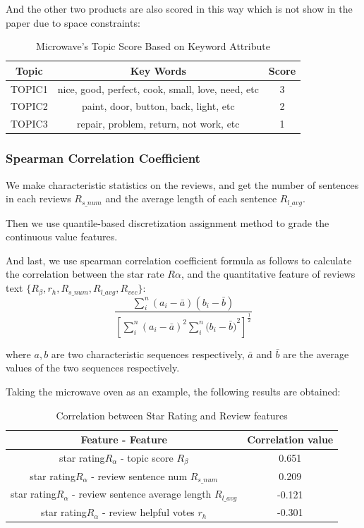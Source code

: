 \documentclass{mcmthesis}
\begin{document}
And the other two products are also scored in this way which is not show in the paper due to space constraints:
\begin{table}[H]
	\center
	\caption{ Microwave's Topic Score Based on Keyword Attribute}
	\label{type}
	\begin{tabular}{c|c|c}
		\hline
		\textbf{Topic} & \textbf{Key Words} & \textbf{Score} \\ \hline
		TOPIC1                & nice, good, perfect, cook, small, love, need, etc        		&	3          \\ 
		TOPIC2                & paint, door, button, back, light, etc  &	2                 \\ 
		TOPIC3                & repair, problem, return, not work, etc                   		&	1	\\ \hline
	\end{tabular}
\end{table}
\subsubsection{Spearman Correlation Coefficient}
We make characteristic statistics on the reviews, and get the number of sentences in each reviews $R_{s\_{num}}$ and the average length of each sentence $R_{l\_{avg}}$. 

Then we use quantile-based discretization assignment method to grade the continuous value features.

And last, we use spearman correlation coefficient formula as follows to calculate the correlation between the star rate $R {\alpha} $, and the quantitative feature of reviews text ${\{R_{\beta},r_{h},R_{s\_{num}},R_{l\_{avg}},R_{vec}\}}$:
\begin{equation}
	{\frac{\sum_{i}^{n}(a_{i}-\bar{a})(b_{i}-\bar{b})}{{[\sum_{i}^{n}{(a_{i}-\bar{a})}^2\sum_{i}^{n}({b_{i}-\bar{b})}^2]}^{\frac{1}{2}}}}
\end{equation} 

where $a,b$ are two characteristic sequences respectively, ${\bar{a}}$ and ${\bar{b}}$ are the average values of the two sequences respectively.

Taking the microwave oven as an example, the following results are obtained:
\begin{table}[H]
	\center
	\caption{Correlation between Star Rating and Review features}
	\label{type}
	\begin{tabular}{c|c}
		\hline
		\textbf{Feature - Feature} & \textbf{Correlation value} \\ \hline
		star rating$R_{\alpha}$ -  topic score $R_{\beta}$             & 0.651                    \\ 
		star rating$R_{\alpha}$ -  review sentence num  $R_{s\_{num}}$              & 0.209                     \\ 
		star rating$R_{\alpha}$ -  review sentence average length  $R_{l\_{avg}}$              & -0.121                     \\ 
		star rating$R_{\alpha}$ -  review helpful votes  $r_{h}$                & -0.301 	\\ \hline
	\end{tabular}
\end{table}
\end{document}
